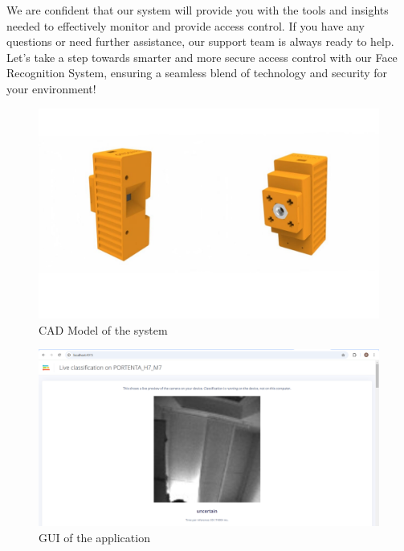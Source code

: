 We are confident that our system will provide you with the tools and insights needed to effectively monitor and provide access control. If you have any questions or need further assistance, our support team is always ready to help. Let’s take a step towards smarter and more secure access control with our Face Recognition System, ensuring a seamless blend of technology and security for your environment!

\begin{figure}
	\begin{center}
		\includegraphics[width=0.7\linewidth]{Images/CAD_Model.jpg}
		\caption{CAD Model of the system}
		\label{CAD_Model}
	\end{center}
\end{figure}

\begin{figure}
	\begin{center}
		\includegraphics[width=0.7\linewidth]{Images/intro.png}
		\caption{GUI of the application}
		\label{GUI}
	\end{center}
\end{figure}
